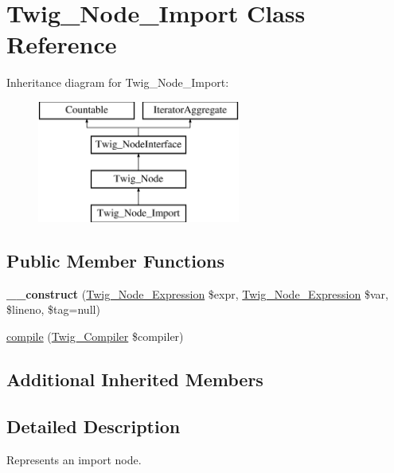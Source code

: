 \hypertarget{class_twig___node___import}{}\section{Twig\+\_\+\+Node\+\_\+\+Import Class Reference}
\label{class_twig___node___import}
Inheritance diagram for Twig\+\_\+\+Node\+\_\+\+Import\+:\begin{figure}[H]
\begin{center}
\leavevmode
\includegraphics[height=4.000000cm]{class_twig___node___import}
\end{center}
\end{figure}
\subsection*{Public Member Functions}
\begin{DoxyCompactItemize}
\item 
\hypertarget{class_twig___node___import_a53cd815bb8dde58d27defc0c69dce183}{}{\bfseries \+\_\+\+\_\+construct} (\hyperlink{class_twig___node___expression}{Twig\+\_\+\+Node\+\_\+\+Expression} \$expr, \hyperlink{class_twig___node___expression}{Twig\+\_\+\+Node\+\_\+\+Expression} \$var, \$lineno, \$tag=null)\label{class_twig___node___import_a53cd815bb8dde58d27defc0c69dce183}

\item 
\hyperlink{class_twig___node___import_a4e0faa87c3fae583620b84d3607085da}{compile} (\hyperlink{class_twig___compiler}{Twig\+\_\+\+Compiler} \$compiler)
\end{DoxyCompactItemize}
\subsection*{Additional Inherited Members}


\subsection{Detailed Description}
Represents an import node.

